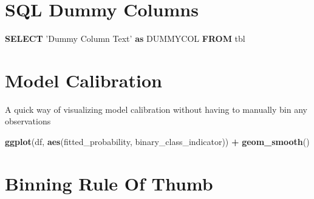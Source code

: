 \documentclass[]{book}
\newenvironment{Shaded}{\begin{snugshade}}{\end{snugshade}}
\newcommand{\CommentTok}[1]{\textcolor[rgb]{0.56,0.35,0.01}{\textit{#1}}}
\newcommand{\DataTypeTok}[1]{\textcolor[rgb]{0.13,0.29,0.53}{#1}}
\newcommand{\DecValTok}[1]{\textcolor[rgb]{0.00,0.00,0.81}{#1}}
\newcommand{\KeywordTok}[1]{\textcolor[rgb]{0.13,0.29,0.53}{\textbf{#1}}}
\newcommand{\NormalTok}[1]{#1}
\newcommand{\OperatorTok}[1]{\textcolor[rgb]{0.81,0.36,0.00}{\textbf{#1}}}
\newcommand{\StringTok}[1]{\textcolor[rgb]{0.31,0.60,0.02}{#1}}
\begin{document}
\hypertarget{sql-dummy-columns}{%
\section{SQL Dummy Columns}\label{sql-dummy-columns}}

\begin{Shaded}
\begin{Highlighting}[]
\KeywordTok{SELECT} \StringTok{'Dummy Column Text'} \KeywordTok{as}\NormalTok{ DUMMYCOL }\KeywordTok{FROM}\NormalTok{ tbl}
\end{Highlighting}
\end{Shaded}

\hypertarget{model-calibration}{%
\section{Model Calibration}\label{model-calibration}}

A quick way of visualizing model calibration without having to manually bin any observations

\begin{Shaded}
\begin{Highlighting}[]
\KeywordTok{ggplot}\NormalTok{(df, }\KeywordTok{aes}\NormalTok{(fitted_probability, binary_class_indicator)) }\OperatorTok{+}\StringTok{ }\KeywordTok{geom_smooth}\NormalTok{()}
\end{Highlighting}
\end{Shaded}

\hypertarget{binning-rule-of-thumb}{%
\section{Binning Rule Of Thumb}\label{binning-rule-of-thumb}}

\begin{Shaded}
\end{Shaded}
\end{document}

